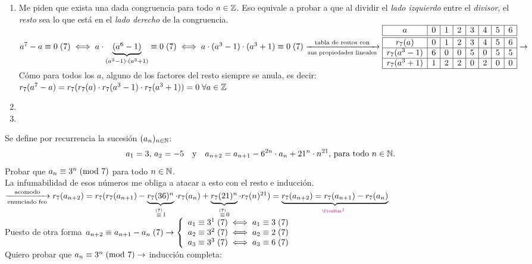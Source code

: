 \begin{enumerate}[label=\roman*)]
	\item Me piden que exista una dada congruencia para todo $a \en \enteros$. Eso equivale a probar a que al dividir el \textit{lado izquierdo}
	      entre el \textit{divisor}, el \textit{resto} sea lo que está en el \textit{lado derecho} de la congruencia.\\
	      $\congruencia{a^7 - a}{0}{7}
		      \sisolosi \congruencia{a \cdot \ub{(a^6 - 1)}{(a^3 - 1) \cdot (a^3 + 1)}}{0}{7}
		      \sisolosi \congruencia{a \cdot (a^3 - 1) \cdot (a^3 + 1)}{0}{7}
		      \flecha{tabla de restos con}[sus propiedades lineales]\\
		      \begin{array}{|c|c|c|c|c|c|c|c|}
			      \hline
			      a            & 0 & 1 & 2 & 3 & 4 & 5 & 6 \\ \hline\hline
			      r_7(a)       & 0 & 1 & 2 & 3 & 4 & 5 & 6 \\ \hline
			      r_7(a^3 - 1) & 6 & 0 & 0 & 5 & 0 & 5 & 5 \\ \hline
			      r_7(a^3 + 1) & 1 & 2 & 2 & 0 & 2 & 0 & 0 \\ \hline
		      \end{array}
		      \to $ Cómo para todos los $a$, alguno de los factores del resto siempre se anula, es decir:\\
	      $r_7(a^7 - a) = r_7(r_7(a) \cdot  r_7(a^3 - 1) \cdot r_7(a^3 + 1)) = 0 \paratodo a \en \enteros$
	\item
	\item

\end{enumerate}

\ejercicio
\separadorCorto

\ejercicio
\def\cong7{\stackrel{(7)}\congruente }
Se define por recurrencia la sucesión $(a_n)_{n\en\naturales}$:\\
\[
	a_1 = 3,\, a_2 = -5 \ytext a_{n+2} = a_{n+1} - 6^{2n} \cdot a_n + 21^n \cdot n^{21} \text{, para todo } n \en \naturales.
\]
Probar que $\congruencia{a_n}{3^n}{\text{mod } 7} $ para todo $n\en\naturales$.\\
\separadorCorto
La infumabilidad de esos números me obliga a atacar a esto con el resto e inducción.\\
$\flecha{acomodo}[enunciado feo]
	r_7(a_{n+2}) = r_7( r_7(a_{n+1}) - \ub{r_7(36)^n}{\cong7 1} \cdot r_7(a_n) + \ub{r_7(21)^n}{\cong7 0} \cdot r_7(n)^{21}  ) =
	\ub{r_7(a_{n+2}) = r_7(a_{n+1}) - r_7(a_n)}{\llamada{1}\ } $\Tilde\\
Puesto de otra forma $ \congruencia{a_{n+2}}{a_{n+1} - a_n}{7}
	\to
	\llave{l}{
		\congruencia{a_1}{3^1}{7} \sisolosi \congruencia{a_1}{3}{7}   \\
		\congruencia{a_2}{3^2}{7} \sisolosi \congruencia{a_2}{2}{7}  \\
		\congruencia{a_3}{3^3}{7} \sisolosi \congruencia{a_3}{6}{7}  \\
	}$\\
Quiero probar que  $\congruencia{a_n}{3^n}{\text{mod } 7} \to$  inducción completa:\\

